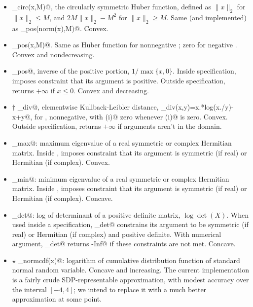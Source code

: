 \documentclass[12pt]{article}
\begin{document}
\begin{itemize}
\item \verb@huber_circ(x,M)@, the circularly symmetric Huber function,
defined as $\|x\|_2$ for $\|x\|_2 \leq M$, and
$2M\|x\|_2-M^2$ for $\|x\|_2 \geq M$.
Same (and implemented) as \verb@huber_pos(norm(x),M)@. Convex.

\item \verb@huber_pos(x,M)@.  
Same as Huber function for nonnegative \verb@x@; zero for negative \verb@x@.
Convex and nondecreasing. 

\item \verb@inv_pos@, inverse of the positive portion, $1/\max\{x,0\}$.
Inside \cvx specification,
imposes constraint that its argument is positive.
Outside \cvx specification, returns $+\infty$ if $x\leq 0$.
Convex and decreasing.
\item $\dagger$ \verb@kl_div@, elementwise Kullback-Leibler distance,
\verb@kl_div(x,y)=x.*log(x./y)-x+y@, for \verb@x@, \verb@y@ nonnegative,
with \verb@x(i)@ zero whenever \verb@y(i)@ is zero.  Convex.
Outside \cvx specification, returns $+\infty$ if arguments aren't
in the domain.

\item \verb@lambda_max@: maximum eigenvalue of a real symmetric 
or complex Hermitian matrix.
Inside \cvx, imposes constraint that its argument 
is symmetric (if real) or Hermitian (if complex).
Convex.
\item \verb@lambda_min@: minimum eigenvalue of a real symmetric 
or complex Hermitian matrix.
Inside \cvx, imposes constraint that its argument 
is symmetric (if real) or Hermitian (if complex).
Concave.

\item \verb@log_det@: log of determinant of a positive definite matrix,
$\log \det(X)$.
When used inside a \cvx specification, \verb@log_det@ constrains
its argument to be symmetric (if real) or Hermitian (if complex) and 
positive definite. 
With numerical argument, \verb@log_det@ returns \verb@-Inf@ if these
constraints are not met. Concave.
\item $\star$ \verb@log_normcdf(x)@: logarithm of cumulative distribution
function of standard normal random variable.  Concave and increasing.
The current implementation is a fairly crude SDP-representable approximation,
with modest accuracy over the interval $[-4,4]$; we intend to replace it
with a much better approximation at some point.


\end{itemize}
\end{document}
